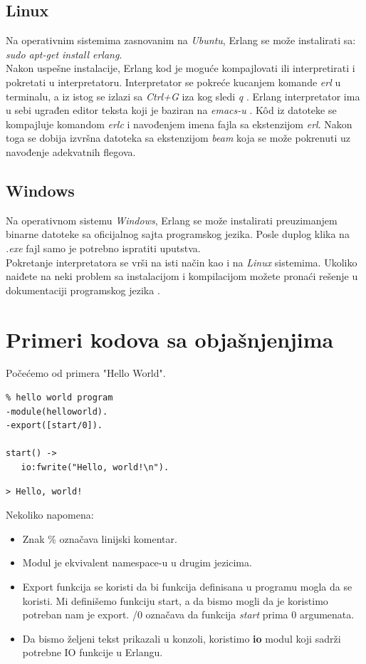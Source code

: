 \documentclass[a4paper]{article}
\begin{document}
{\subsection{Linux}
\label{subsec:instalacijaLinux}

Na operativnim sistemima zasnovanim na {\em Ubuntu}, Erlang se može instalirati sa:
{\em sudo apt-get install erlang}. \\

Nakon uspešne instalacije, Erlang kod je moguće kompajlovati
ili interpretirati i pokretati u interpretatoru.
Interpretator se pokreće kucanjem komande {\em erl} u terminalu, a iz istog
se izlazi sa {\em Ctrl+G} iza kog sledi {\em q} \cite{book_joe}.
Erlang interpretator ima u sebi ugrađen editor teksta koji je baziran na {\em emacs-u} \cite{book_fred}.
K\^od iz datoteke se kompajluje komandom {\em erlc} i navođenjem imena fajla sa ekstenzijom {\em erl}.
Nakon toga se dobija izvršna datoteka sa ekstenzijom {\em beam} koja se može
pokrenuti uz navođenje adekvatnih flegova. 

\subsection{Windows}
\label{subsec:instalacijaWindows}
Na operativnom sistemu {\em Windows}, Erlang se može instalirati preuzimanjem binarne datoteke sa oficijalnog sajta \cite{sajt} programskog jezika. Posle duplog klika na {\em .exe} fajl samo je potrebno ispratiti uputstva. \\

Pokretanje interpretatora se vrši na isti način kao i na {\em Linux} sistemima. Ukoliko naiđete na neki problem sa instalacijom i kompilacijom možete pronaći rešenje u dokumentaciji programskog jezika \cite{sajt}.

\section{Primeri kodova sa objašnjenjima}
\label{sec:primeri}
Počećemo od primera "Hello World".  
\begin{verbatim}
% hello world program
-module(helloworld). 
-export([start/0]). 

start() -> 
   io:fwrite("Hello, world!\n").
\end{verbatim}
\begin{verbatim}
> Hello, world!
\end{verbatim}

Nekoliko napomena:
\begin{itemize}
  \item Znak \% označava linijski komentar.
  \item Modul je ekvivalent namespace-u u drugim jezicima.
  \item Export funkcija se koristi da bi funkcija definisana u programu mogla da se koristi. Mi definišemo funkciju start, a da bismo mogli da je koristimo potreban nam je export. /0 označava da funkcija \textit{start} prima 0 argumenata.
  \item Da bismo željeni tekst prikazali u konzoli, koristimo \textbf{io} modul koji sadrži potrebne IO funkcije u Erlangu.
\end{itemize}

}
\end{document}

